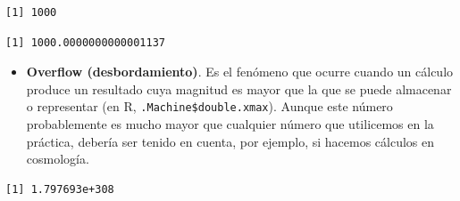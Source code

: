 \documentclass[openany]{book}
\newenvironment{Shaded}{\begin{snugshade}}{\end{snugshade}}
\newcommand{\DataTypeTok}[1]{\textcolor[rgb]{0.13,0.29,0.53}{#1}}
\newcommand{\DecValTok}[1]{\textcolor[rgb]{0.00,0.00,0.81}{#1}}
\newcommand{\KeywordTok}[1]{\textcolor[rgb]{0.13,0.29,0.53}{\textbf{#1}}}
\newcommand{\NormalTok}[1]{#1}
\newcommand{\OperatorTok}[1]{\textcolor[rgb]{0.81,0.36,0.00}{\textbf{#1}}}
\newcommand{\StringTok}[1]{\textcolor[rgb]{0.31,0.60,0.02}{#1}}
\providecommand{\tightlist}{%
  \setlength{\itemsep}{0pt}\setlength{\parskip}{0pt}}
\begin{document}
\begin{Shaded}
\end{Shaded}

\begin{verbatim}
[1] 1000
\end{verbatim}

\begin{Shaded}
\end{Shaded}

\begin{verbatim}
[1] 1000.0000000000001137
\end{verbatim}

\begin{itemize}
\tightlist
\item
  \textbf{Overflow (desbordamiento)}. Es el fenómeno que ocurre cuando un cálculo produce un resultado cuya magnitud es mayor que la que se puede almacenar o representar (en R, \texttt{.Machine\$double.xmax}). Aunque este número probablemente es mucho mayor que cualquier número que utilicemos en la práctica, debería ser tenido en cuenta, por ejemplo, si hacemos cálculos en cosmología.
\end{itemize}

\begin{Shaded}
\end{Shaded}

\begin{verbatim}
[1] 1.797693e+308
\end{verbatim}

\begin{Shaded}
\end{Shaded}
\end{document}
